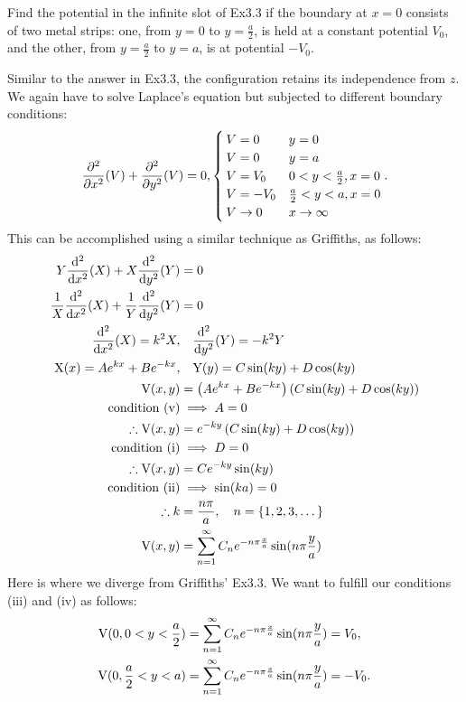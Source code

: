\begin{hwkProblem}{3.13}{}
	
	Find the potential in the infinite slot of Ex3.3 if the boundary at \( x = 0 \) consists of two metal strips: one, from \( y = 0 \) to \( y = \frac{a}{2} \), is held at a constant potential \( V_{0} \), and the other, from \( y = \frac{a}{2} \) to \( y = a \), is at potential \( -V_{0} \).

	\hwkSol{}

	Similar to the answer in Ex3.3, the configuration retains its independence from \( z \). We again have to solve Laplace's equation but subjected to different boundary conditions:
	\[
		\frac{\partial^{2}}{\partial{}{x}^2} (V) + \frac{\partial^{2}}{\partial{}{y}^2} (V) = 0,
		\begin{cases}
			V = 0 & y = 0 \\
			V = 0 & y = a \\
			V = V_{0} & 0 < y < \frac{a}{2}, x = 0 \\
			V = -V_{0} & \frac{a}{2} < y < a, x = 0 \\
			V \to 0 & x \to \infty
		\end{cases}
	.\]
	This can be accomplished using a similar technique as Griffiths, as follows:
	\begin{align*}
		Y \derivsec{x}{X} + X \derivsec{y}{Y} &= 0 \\
		\frac{1}{X} \derivsec{x}{X} + \frac{1}{Y} \derivsec{y}{Y} &= 0 \\
		\derivsec{x}{X} = k^{2}X ,& \quad \derivsec{y}{Y} = -k^{2}Y \\
		\func{X}[x] = Ae^{kx}+Be^{-kx} ,& \quad \func{Y}[y] = C \sin{ky} + D \cos{ky} \\
		\func{V}[x, y] &= \left(Ae^{kx}+Be^{-kx}\right) \left(C \sin{ky} + D \cos{ky}\right) \\
		\text{condition (v)} &\implies A = 0 \\
		\therefore \func{V}[x, y] &= e^{-ky} \left(C \sin{ky} + D \cos{ky}\right) \\
		\text{condition (i)} &\implies D = 0 \\
		\therefore \func{V}[x, y] &= C e^{-ky} \sin{ky} \\
		\text{condition (ii)} &\implies \sin{ka} = 0 \\
		\therefore k &= \frac{n\pi}{a}, \quad n = \left\{1, 2, 3, \dots\right\} \\
		\func{V}[x, y] &= \sum_{n=1}^{\infty}C_{n}e^{-n \pi \frac{x}{a}} \sin{n \pi \frac{y}{a}}
	\end{align*}
	Here is where we diverge from Griffiths' Ex3.3. We want to fulfill our conditions (iii) and (iv) as follows:
	\begin{align*}
		\func{V}[0, 0<y<\frac{a}{2}] &= \sum_{n=1}^{\infty}C_{n}e^{-n \pi \frac{x}{a}} \sin{n \pi \frac{y}{a}} = V_{0}, \\
		\func{V}[0, \frac{a}{2}<y<a] &= \sum_{n=1}^{\infty}C_{n}e^{-n \pi \frac{x}{a}} \sin{n \pi \frac{y}{a}} = -V_{0}.
	\end{align*}

\end{hwkProblem}

